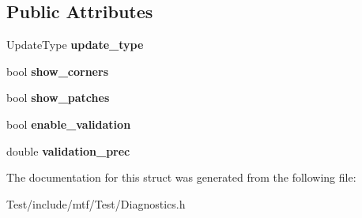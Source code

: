 \subsection*{Public Attributes}
\begin{DoxyCompactItemize}
\item 
\hypertarget{structDiagnosticsParams_aefd23c8724dece8438b29f364c3ab2e0}{Update\-Type {\bfseries update\-\_\-type}}\label{structDiagnosticsParams_aefd23c8724dece8438b29f364c3ab2e0}

\item 
\hypertarget{structDiagnosticsParams_afe4101321aff7562698e879000db7999}{bool {\bfseries show\-\_\-corners}}\label{structDiagnosticsParams_afe4101321aff7562698e879000db7999}

\item 
\hypertarget{structDiagnosticsParams_ad761a87f2aaed018701ff35b17270135}{bool {\bfseries show\-\_\-patches}}\label{structDiagnosticsParams_ad761a87f2aaed018701ff35b17270135}

\item 
\hypertarget{structDiagnosticsParams_ae32e84a44638a5ad5c01737f208ff139}{bool {\bfseries enable\-\_\-validation}}\label{structDiagnosticsParams_ae32e84a44638a5ad5c01737f208ff139}

\item 
\hypertarget{structDiagnosticsParams_a5852e14acd13967278975a54b8bb8cb5}{double {\bfseries validation\-\_\-prec}}\label{structDiagnosticsParams_a5852e14acd13967278975a54b8bb8cb5}

\end{DoxyCompactItemize}


The documentation for this struct was generated from the following file\-:\begin{DoxyCompactItemize}
\item 
Test/include/mtf/\-Test/Diagnostics.\-h\end{DoxyCompactItemize}

